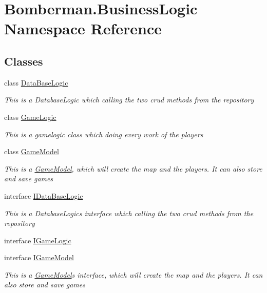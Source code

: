 \hypertarget{namespace_bomberman_1_1_business_logic}{}\section{Bomberman.\+Business\+Logic Namespace Reference}
\label{namespace_bomberman_1_1_business_logic}
\subsection*{Classes}
\begin{DoxyCompactItemize}
\item 
class \mbox{\hyperlink{class_bomberman_1_1_business_logic_1_1_data_base_logic}{Data\+Base\+Logic}}
\begin{DoxyCompactList}\small\item\em This is a Database\+Logic which calling the two crud methods from the repository \end{DoxyCompactList}\item 
class \mbox{\hyperlink{class_bomberman_1_1_business_logic_1_1_game_logic}{Game\+Logic}}
\begin{DoxyCompactList}\small\item\em This is a gamelogic class which doing every work of the players \end{DoxyCompactList}\item 
class \mbox{\hyperlink{class_bomberman_1_1_business_logic_1_1_game_model}{Game\+Model}}
\begin{DoxyCompactList}\small\item\em This is a \mbox{\hyperlink{class_bomberman_1_1_business_logic_1_1_game_model}{Game\+Model}}, which will create the map and the players. It can also store and save games \end{DoxyCompactList}\item 
interface \mbox{\hyperlink{interface_bomberman_1_1_business_logic_1_1_i_data_base_logic}{I\+Data\+Base\+Logic}}
\begin{DoxyCompactList}\small\item\em This is a Database\+Logic\textquotesingle{}s interface which calling the two crud methods from the repository \end{DoxyCompactList}\item 
interface \mbox{\hyperlink{interface_bomberman_1_1_business_logic_1_1_i_game_logic}{I\+Game\+Logic}}
\item 
interface \mbox{\hyperlink{interface_bomberman_1_1_business_logic_1_1_i_game_model}{I\+Game\+Model}}
\begin{DoxyCompactList}\small\item\em This is a \mbox{\hyperlink{class_bomberman_1_1_business_logic_1_1_game_model}{Game\+Model}}\textquotesingle{}s interface, which will create the map and the players. It can also store and save games \end{DoxyCompactList}\end{DoxyCompactItemize}
